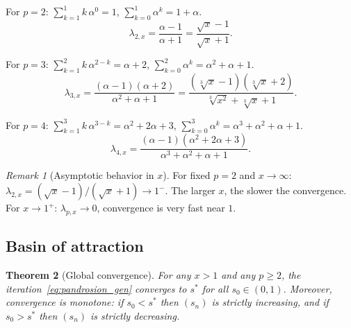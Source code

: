 \documentclass[10pt,a4paper,oneside]{book}
\newtheorem{theorem}{Theorem}[chapter]
\theoremstyle{definition}
\theoremstyle{remark}
\newtheorem{remark}[theorem]{Remark}
\newcommand{\cbrt}[1]{\sqrt[3]{#1}}
\begin{document}
For $p = 2$: $\sum_{k=1}^{1} k\,\alpha^{0} = 1$, $\sum_{k=0}^{1}\alpha^k = 1 + \alpha$.
\begin{equation}
  \label{eq:lambda2}
  \lambda_{2,x} = \frac{\alpha - 1}{\alpha + 1} = \frac{\sqrt{x} - 1}{\sqrt{x} + 1}.
\end{equation}

For $p = 3$: $\sum_{k=1}^{2} k\,\alpha^{2-k} = \alpha + 2$, $\sum_{k=0}^{2}\alpha^k = \alpha^2+\alpha+1$.
\begin{equation}
  \label{eq:lambda3}
  \lambda_{3,x} = \frac{(\alpha-1)(\alpha+2)}{\alpha^2 + \alpha + 1} = \frac{(\cbrt{x}-1)(\cbrt{x}+2)}{\cbrt{x^2}+\cbrt{x}+1}.
\end{equation}

For $p = 4$: $\sum_{k=1}^{3}k\,\alpha^{3-k} = \alpha^2 + 2\alpha + 3$, $\sum_{k=0}^{3}\alpha^k = \alpha^3+\alpha^2+\alpha+1$.
\begin{equation}
  \label{eq:lambda4}
  \lambda_{4,x} = \frac{(\alpha-1)(\alpha^2+2\alpha+3)}{\alpha^3+\alpha^2+\alpha+1}.
\end{equation}

\begin{remark}[Asymptotic behavior in $x$]
For fixed $p = 2$ and $x \to \infty$: $\lambda_{2,x} = (\sqrt{x}-1)/(\sqrt{x}+1) \to 1^-$. The larger $x$, the slower the convergence. For $x \to 1^+$: $\lambda_{p,x} \to 0$, convergence is very fast near $1$.
\end{remark}

\subsection{Basin of attraction}

\begin{theorem}[Global convergence]
\label{thm:bassin}
For any $x > 1$ and any $p \geq 2$, the iteration~\eqref{eq:pandrosion_gen} converges to $s^*$ for all $s_0 \in (0,1)$. Moreover, convergence is \emph{monotone}: if $s_0 < s^*$ then $(s_n)$ is strictly increasing, and if $s_0 > s^*$ then $(s_n)$ is strictly decreasing.
\end{theorem}
\end{document}
